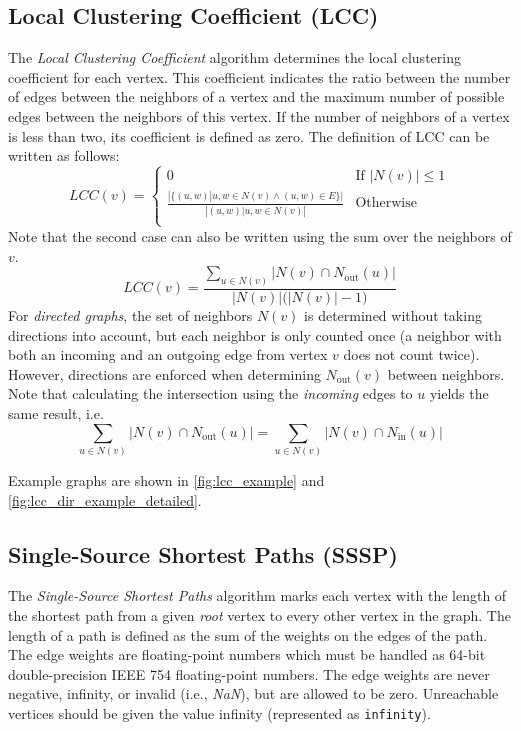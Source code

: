 \subsection{Local Clustering Coefficient (LCC)}
\label{sec:lcc}
The \emph{Local Clustering Coefficient} algorithm determines the local clustering coefficient for each vertex. This coefficient indicates the ratio between the number of edges between the neighbors of a vertex and the maximum number of possible edges between the neighbors of this vertex. If the number of neighbors of a vertex is less than two, its coefficient is defined as zero. The definition of LCC can be written as follows:
%
\begin{equation}
LCC(v) = \begin{cases}
0 & \text{If } |N(v)| \leq 1 \\
\frac{|\{(u, w) | u, w \in N(v) \wedge (u, w) \in E\}|}
{|{(u,w) | u, w \in N(v)}|} & \text{Otherwise} \\
\end{cases}
\end{equation}
%
Note that the second case can also be written using the sum over the neighbors of $v$.
%
\begin{equation}
LCC(v) = \frac{\sum_{u \in N(v)} |N(v) \cap N_\mathrm{out}(u)|}{|N(v)| \big( |N(v)| - 1 \big)}
\end{equation}
%
For \emph{directed graphs}, the set of neighbors $N(v)$ is determined without taking directions into account, but each neighbor is only counted once (a neighbor with both an incoming and an outgoing edge from vertex $v$ does not count twice).
However, directions are enforced when determining $N_\mathrm{out}(v)$ between neighbors. Note that calculating the intersection using the \emph{incoming} edges to $u$ yields the same result, i.e.\
\begin{equation}
	\sum_{u \in N(v)} |N(v) \cap N_\mathrm{out}(u)| = 
	\sum_{u \in N(v)} |N(v) \cap N_\mathrm{in}(u)|
\end{equation}

Example graphs are shown in \autoref{fig:lcc_example} and \autoref{fig:lcc_dir_example_detailed}.

\subsection{Single-Source Shortest Paths (SSSP)}
\label{sec:sssp}
The \emph{Single-Source Shortest Paths} algorithm marks each vertex with the length of the shortest path from a given \emph{root} vertex to every other vertex in the graph. The length of a path is defined as the sum of the weights on the edges of the path. The edge weights are floating-point numbers which must be handled as 64-bit double-precision IEEE 754 floating-point numbers. The edge weights are never negative, infinity, or invalid (i.e., \emph{NaN}), but are allowed to be zero. Unreachable vertices should be given the value infinity (represented as \texttt{infinity}).

